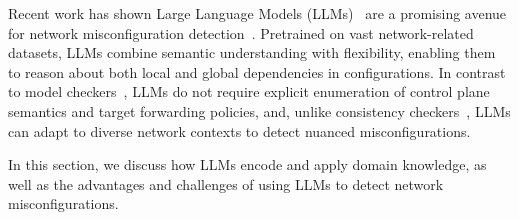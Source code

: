 
Recent work has shown Large Language Models (LLMs)~\cite{deepseekai2024deepseekv3technicalreport, achiam2023gpt} are a promising avenue for network misconfiguration detection~\cite{bogdanov2024leveraging, chen2024automatic, wang2024identifying, lian2023configuration}.
Pretrained on vast network-related datasets, LLMs combine semantic understanding with flexibility, enabling them to reason about both local and global dependencies in configurations.
In contrast to model checkers~\cite{fogel2015general, beckett2017general, abhashkumar2020tiramisu, prabhu2020plankton, zhang2022sre, steffen2020netdice, ye2020hoyan, ritchey2000using,al2011configchecker, jeffrey2009model, batfish}, LLMs do not require explicit enumeration of control plane semantics and target forwarding policies, and, unlike consistency checkers~\cite{kakarla2024diffy,kakarla2020finding, le2006minerals, feamster2005detecting, tang2021campion, le2008detecting, le2006characterization, batfish}, LLMs can adapt to diverse network contexts to detect nuanced misconfigurations. 

In this section, we discuss how LLMs encode and apply domain knowledge, as well as the advantages and challenges of using LLMs to detect network misconfigurations.

